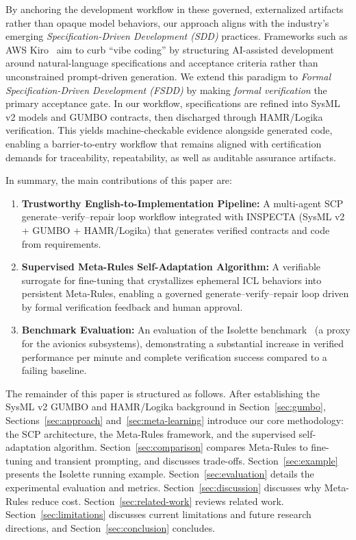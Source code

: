 \documentclass[conference]{IEEEtran}
\begin{document}
By anchoring the development workflow in these governed, externalized artifacts rather than opaque model behaviors, our approach aligns with the industry's emerging \textit{Specification-Driven Development (SDD)} practices. Frameworks such as AWS Kiro~\cite{amazon2024mathematical} aim to curb ``vibe coding'' by structuring AI-assisted development around natural-language specifications and acceptance criteria rather than unconstrained prompt-driven generation. We extend this paradigm to \textit{Formal Specification-Driven Development (FSDD)} by making \emph{formal verification} the primary acceptance gate. In our workflow, specifications are refined into SysML v2 models and GUMBO contracts, then discharged through HAMR/Logika verification. This yields machine-checkable evidence alongside generated code, enabling a barrier-to-entry workflow that remains aligned with certification demands for traceability, repeatability, as well as auditable assurance artifacts.

In summary, the main contributions of this paper are:
\begin{enumerate}
    \item \textbf{Trustworthy English-to-Implementation Pipeline:} A multi-agent SCP generate--verify--repair loop workflow integrated with INSPECTA (SysML v2 + GUMBO + HAMR/Logika) that generates verified contracts and code from requirements.
    \item \textbf{Supervised Meta-Rules Self-Adaptation Algorithm:} A verifiable surrogate for fine-tuning that crystallizes ephemeral ICL behaviors into persistent Meta-Rules, enabling a governed generate--verify--repair loop driven by formal verification feedback and human approval.
    \item \textbf{Benchmark Evaluation:} An evaluation of the Isolette benchmark~\cite{hatcliff2024isolette} (a proxy for the avionics subsystems), demonstrating a substantial increase in verified performance per minute and complete verification success compared to a failing baseline.
\end{enumerate}

The remainder of this paper is structured as follows. After establishing the SysML v2 GUMBO and HAMR/Logika background in Section~\ref{sec:gumbo}, Sections~\ref{sec:approach} and~\ref{sec:meta-learning} introduce our core methodology: the SCP architecture, the Meta-Rules framework, and the supervised self-adaptation algorithm. Section~\ref{sec:comparison} compares Meta-Rules to fine-tuning and transient prompting, and discusses trade-offs. Section~\ref{sec:example} presents the Isolette running example. Section~\ref{sec:evaluation} details the experimental evaluation and metrics. Section~\ref{sec:discussion} discusses why Meta-Rules reduce cost. Section~\ref{sec:related-work} reviews related work. Section~\ref{sec:limitations} discusses current limitations and future research directions, and Section~\ref{sec:conclusion} concludes. 
\end{document}
